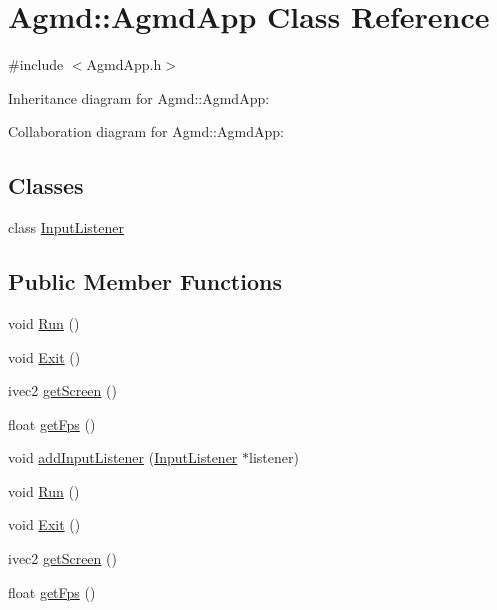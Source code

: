 \hypertarget{class_agmd_1_1_agmd_app}{\section{Agmd\+:\+:Agmd\+App Class Reference}
\label{class_agmd_1_1_agmd_app}
}


{\ttfamily \#include $<$Agmd\+App.\+h$>$}



Inheritance diagram for Agmd\+:\+:Agmd\+App\+:


Collaboration diagram for Agmd\+:\+:Agmd\+App\+:
\subsection*{Classes}
\begin{DoxyCompactItemize}
\item 
class \hyperlink{class_agmd_1_1_agmd_app_1_1_input_listener}{Input\+Listener}
\end{DoxyCompactItemize}
\subsection*{Public Member Functions}
\begin{DoxyCompactItemize}
\item 
void \hyperlink{class_agmd_1_1_agmd_app_ae9893d63db9a73d8adee883fb0ea8282}{Run} ()
\item 
void \hyperlink{class_agmd_1_1_agmd_app_a6150fa7d962c30ac4b6e82b01ed686a6}{Exit} ()
\item 
ivec2 \hyperlink{class_agmd_1_1_agmd_app_a968b39722e8c8149787f6f4ba907e086}{get\+Screen} ()
\item 
float \hyperlink{class_agmd_1_1_agmd_app_ab2aac56da7c2f7071b1e2d60a287a3e9}{get\+Fps} ()
\item 
void \hyperlink{class_agmd_1_1_agmd_app_a1d0cbb731acee2cffb6be5d415140a7c}{add\+Input\+Listener} (\hyperlink{class_agmd_1_1_agmd_app_1_1_input_listener}{Input\+Listener} $\ast$listener)
\item 
void \hyperlink{class_agmd_1_1_agmd_app_ae9893d63db9a73d8adee883fb0ea8282}{Run} ()
\item 
void \hyperlink{class_agmd_1_1_agmd_app_a6150fa7d962c30ac4b6e82b01ed686a6}{Exit} ()
\item 
ivec2 \hyperlink{class_agmd_1_1_agmd_app_a968b39722e8c8149787f6f4ba907e086}{get\+Screen} ()
\item 
float \hyperlink{class_agmd_1_1_agmd_app_ab2aac56da7c2f7071b1e2d60a287a3e9}{get\+Fps} ()
\end{DoxyCompactItemize}
